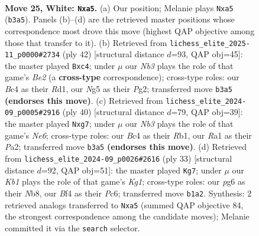 \documentclass[11pt]{article}
\begin{document}
\clearpage

\begin{figure}[p]\centering
\begin{subfigure}{0.46\textwidth}\centering
\resizebox{\linewidth}{!}{%
\newchessgame
\chessboard[
  setfen={r1b3kr/8/ppn1p1p1/b3PpNp/n1B2B2/PN4P1/1P3P1P/RK1R4 w - - 3 25},
  showmover=false,
  pgfstyle=straightmove, color=movearrow, markmove={b3-a5}
]}
\caption{}
\end{subfigure}\hfill
\begin{subfigure}{0.46\textwidth}\centering
\resizebox{\linewidth}{!}{%
\newchessgame
\chessboard[
  setfen={r4r1k/6pp/p2bb3/1p1pp3/2n5/2P1BN2/PP2BPPP/3RR1K1 w - - 3 22},
  showmover=false,
  pgfstyle=straightmove, color=movearrow, markmove={e2-c4}
]}
\caption{}
\end{subfigure}
\\[4pt]
\begin{subfigure}{0.46\textwidth}\centering
\resizebox{\linewidth}{!}{%
\newchessgame
\chessboard[
  setfen={1rb3k1/1p1n1rb1/3pN2p/p2P1p2/2P1p1n1/6PN/P2BBP1P/1R2K2R w K - 3 21},
  showmover=false,
  pgfstyle=straightmove, color=movearrow, markmove={e6-g7}
]}
\caption{}
\end{subfigure}\hfill
\begin{subfigure}{0.46\textwidth}\centering
\resizebox{\linewidth}{!}{%
\newchessgame
\chessboard[
  setfen={rn3rk1/4p3/2p2pPb/ppPp1P1p/3P2b1/3BP3/PP6/R1BNK2R b KQ - 2 17},
  showmover=false,
  pgfstyle=straightmove, color=movearrow, markmove={g8-g7}
]}
\caption{}
\end{subfigure}
\caption{\textbf{Move 25, White: \texttt{Nxa5}.} (a) Our position; Melanie plays \texttt{Nxa5} (\texttt{b3a5}). Panels (b)--(d) are the retrieved master positions whose correspondence most drove this move (highest QAP objective among those that transfer to it). (b) Retrieved from \texttt{lichess\_elite\_2025-11\_p0000\#2734} (ply 42) [structural distance $d$=93, QAP obj=45]: the master played \texttt{Bxc4}; under $\mu$ our \emph{Nb3} plays the role of that game's \emph{Be2} (a \textbf{cross-type} correspondence); cross-type roles: our \emph{B}c4 as their \emph{R}d1, our \emph{N}g5 as their \emph{P}g2; transferred move \texttt{b3a5} \textbf{(endorses this move)}. (c) Retrieved from \texttt{lichess\_elite\_2024-09\_p0005\#2916} (ply 40) [structural distance $d$=79, QAP obj=39]: the master played \texttt{Nxg7}; under $\mu$ our \emph{Nb3} plays the role of that game's \emph{Ne6}; cross-type roles: our \emph{B}c4 as their \emph{R}b1, our \emph{R}a1 as their \emph{P}a2; transferred move \texttt{b3a5} \textbf{(endorses this move)}. (d) Retrieved from \texttt{lichess\_elite\_2024-09\_p0026\#2616} (ply 33) [structural distance $d$=92, QAP obj=51]: the master played \texttt{Kg7}; under $\mu$ our \emph{Kb1} plays the role of that game's \emph{Kg1}; cross-type roles: our \emph{p}g6 as their \emph{N}b8, our \emph{B}f4 as their \emph{P}c6; transferred move \texttt{b1a2}. Synthesis: 2 retrieved analogs transferred to \texttt{Nxa5} (summed QAP objective 84, the strongest correspondence among the candidate moves); Melanie committed it via the \texttt{search} selector.}
\label{fig:thought-m48}
\end{figure}
\end{document}
